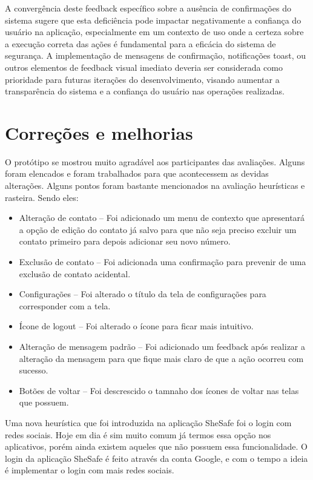 A convergência deste feedback específico sobre a ausência de confirmações do sistema sugere que esta deficiência pode impactar negativamente a confiança do usuário na aplicação, especialmente em um contexto de uso onde a certeza sobre a execução correta das ações é fundamental para a eficácia do sistema de segurança. A implementação de mensagens de confirmação, notificações toast, ou outros elementos de feedback visual imediato deveria ser considerada como prioridade para futuras iterações do desenvolvimento, visando aumentar a transparência do sistema e a confiança do usuário nas operações realizadas.

\section{Correções e melhorias}
O protótipo se mostrou muito agradável aos participantes das avaliações. Alguns foram elencados e foram trabalhados para que acontecessem as devidas alterações. Alguns pontos foram bastante mencionados na avaliação heurísticas e rasteira. Sendo eles: 
\begin{itemize}
\item Alteração de contato – Foi adicionado um menu de contexto que apresentará a opção de edição do contato já salvo para que não seja preciso excluir um contato primeiro para depois adicionar seu novo número.
\item Exclusão de contato – Foi adicionada uma confirmação para prevenir de uma exclusão de contato acidental.
\item Configurações – Foi alterado o título da tela de configurações para corresponder com a tela.
\item Ícone de logout – Foi alterado o ícone para ficar mais intuitivo. 
\item Alteração de mensagem padrão – Foi adicionado um feedback após realizar a alteração da mensagem para que fique mais claro de que a ação ocorreu com sucesso.
\item Botões de voltar – Foi descrescido o tamnaho dos ícones de voltar nas telas que possuem.
\end{itemize}
 
Uma nova heurística que foi introduzida na aplicação SheSafe foi o login com redes sociais. Hoje em dia é sim muito comum já termos essa opção nos aplicativos, porém ainda existem aqueles que não possuem essa funcionalidade. O login da aplicação SheSafe é feito através da conta Google, e com o tempo a ideia é implementar o login com mais redes sociais.

